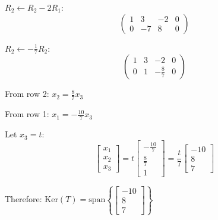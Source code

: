 $R_2 \leftarrow R_2 - 2R_1$:
\[
	\left(\begin{array}{ccc|c}
		1 & 3 & -2 & 0 \\
		0 & -7 & 8 & 0
	\end{array}\right)
\]

$R_2 \leftarrow -\frac{1}{7}R_2$:
\[
	\left(\begin{array}{ccc|c}
		1 & 3 & -2 & 0 \\
		0 & 1 & -\frac{8}{7} & 0
	\end{array}\right)
\]

From row 2: $x_2 = \frac{8}{7}x_3$

From row 1: $x_1 = -\frac{10}{7}x_3$

Let $x_3 = t$:
\[
	\begin{bmatrix}
		x_1 \\ x_2 \\ x_3
	\end{bmatrix} = t\begin{bmatrix}
		-\frac{10}{7} \\ \frac{8}{7} \\ 1
	\end{bmatrix} = \frac{t}{7}\begin{bmatrix}
		-10 \\ 8 \\ 7
	\end{bmatrix}
\]

Therefore: $\text{Ker}(T) = \text{span}\left\{\begin{bmatrix} -10 \\ 8 \\ 7 \end{bmatrix}\right\}$
